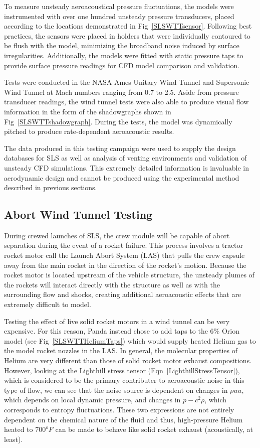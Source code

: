 \documentclass[]{aiaa-tc}%
\begin{document}
To measure unsteady aeroacoustical pressure fluctuations, the models were instrumented with over one hundred unsteady pressure transducers, placed according to the locations demonstrated in Fig~\ref{SLSWTTsensor}.  Following best practices, the sensors were placed in holders that were individually contoured to be flush with the model, minimizing the broadband noise induced by surface irregularities.  Additionally, the models were fitted with static pressure taps to provide surface pressure readings for CFD model comparison and validation.

Tests were conducted in the NASA Ames Unitary Wind Tunnel and Supersonic Wind Tunnel at Mach numbers ranging from 0.7 to 2.5.  Aside from pressure transducer readings, the wind tunnel tests were also able to produce visual flow information in the form of the shadowgraphs shown in Fig~\ref{SLSWTTshadowgraph}.  During the tests, the model was dynamically pitched to produce rate-dependent aeroacoustic results.

The data produced in this testing campaign were used to supply the design databases for SLS as well as analysis of venting environments and validation of unsteady CFD simulations.  This extremely detailed information is invaluable in aerodynamic design and cannot be produced using the experimental method described in previous sections.

\subsection{Abort Wind Tunnel Testing}

During crewed launches of SLS, the crew module will be capable of abort separation during the event of a rocket failure.  This process involves a tractor rocket motor call the Launch Abort System (LAS) that pulls the crew capsule away from the main rocket in the direction of the rocket's motion.  Because the rocket motor is located upstream of the vehicle structure, the unsteady plumes of the rockets will interact directly with the structure as well as with the surrounding flow and shocks, creating additional aeroacoustic effects that are extremely difficult to model.

Testing the effect of live solid rocket motors in a wind tunnel can be very expensive.  For this reason, Panda instead chose to add taps to the 6\% Orion model (see Fig~\ref{SLSWTTHeliumTaps}) which would supply heated Helium gas to the model rocket nozzles in the LAS.  In general, the molecular properties of Helium are very different than those of solid rocket motor exhaust compositions.  However, looking at the Lighthill stress tensor (Eqn~\ref{LighthillStressTensor}), which is considered to be the primary contributer to aeroacoustic noise in this type of flow, we can see that the noise source is dependent on changes in $\rho u u$, which depends on local dynamic pressure, and changes in $p - c^2\rho$, which corresponds to entropy fluctuations.  These two expressions are not entirely dependent on the chemical nature of the fluid and thus, high-pressure Helium heated to $700^oF$ can be made to behave like solid rocket exhaust (acoustically, at least).
\end{document}

